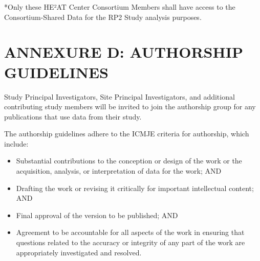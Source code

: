 \documentclass[12pt,letterpaper]{article}
\begin{document}
*Only these HE²AT Center Consortium Members shall have access to the Consortium-Shared Data for the RP2 Study analysis purposes.

\section*{ANNEXURE D: AUTHORSHIP GUIDELINES}

Study Principal Investigators, Site Principal Investigators, and additional contributing study members will be invited to join the authorship group for any publications that use data from their study.

The authorship guidelines adhere to the ICMJE criteria for authorship, which include:
\begin{itemize}
    \item Substantial contributions to the conception or design of the work or the acquisition, analysis, or interpretation of data for the work; AND
    \item Drafting the work or revising it critically for important intellectual content; AND
    \item Final approval of the version to be published; AND
    \item Agreement to be accountable for all aspects of the work in ensuring that questions related to the accuracy or integrity of any part of the work are appropriately investigated and resolved.
\end{itemize}
\end{document}
